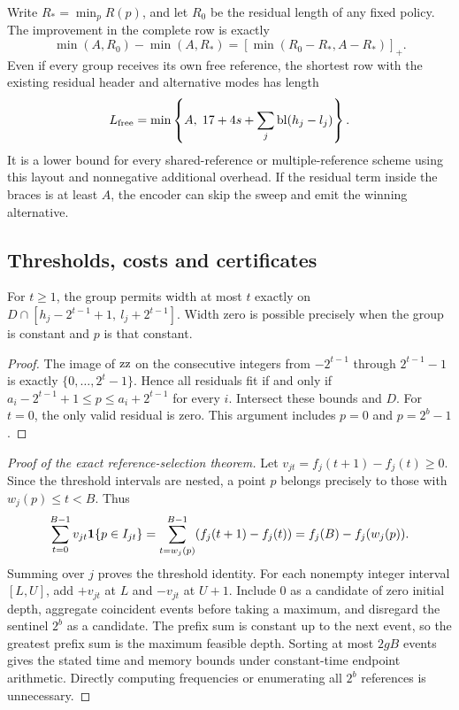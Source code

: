 \begin{proposition}\label{th:lower}
Write $R_*=\min_p R(p)$, and let $R_0$ be the residual length of any fixed policy. The improvement in the complete row is exactly
\[
 \min(A,R_0)-\min(A,R_*)=[\min(R_0-R_*,A-R_*)]_+ .
\]
Even if every group receives its own free reference, the shortest row with the existing residual header and alternative modes has length
\[
 L_{\rm free}=\min\left\{A,\;17+4s+\sum_j\operatorname{bl}(h_j-l_j)\right\}.
\]
It is a lower bound for every shared-reference or multiple-reference scheme using this layout and nonnegative additional overhead. If the residual term inside the braces is at least $A$, the encoder can skip the sweep and emit the winning alternative.
\end{proposition}


\subsection{Thresholds, costs and certificates}
\begin{lemma}\label{lem:threshold}
For $t\ge1$, the group permits width at most $t$ exactly on
$D\cap [h_j-2^{t-1}+1,\ l_j+2^{t-1}]$. Width zero is possible precisely when the group is constant and $p$ is that constant.
\end{lemma}
\begin{proof}
The image of $\operatorname{zz}$ on the consecutive integers from $-2^{t-1}$ through $2^{t-1}-1$ is exactly $\{0,\ldots,2^t-1\}$. Hence all residuals fit if and only if $a_i-2^{t-1}+1\le p\le a_i+2^{t-1}$ for every $i$. Intersect these bounds and $D$. For $t=0$, the only valid residual is zero. This argument includes $p=0$ and $p=2^b-1$.
\end{proof}
\begin{proof}[Proof of the exact reference-selection theorem]
Let $v_{jt}=f_j(t+1)-f_j(t)\ge0$. Since the threshold intervals are nested, a point $p$ belongs precisely to those with $w_j(p)\le t<B$. Thus
\[
 \sum_{t=0}^{B-1}v_{jt}\mathbf 1\{p\in I_{jt}\}
 =\sum_{t=w_j(p)}^{B-1}(f_j(t+1)-f_j(t))=f_j(B)-f_j(w_j(p)).
\]
Summing over $j$ proves the threshold identity. For each nonempty integer interval $[L,U]$, add $+v_{jt}$ at $L$ and $-v_{jt}$ at $U+1$. Include $0$ as a candidate of zero initial depth, aggregate coincident events before taking a maximum, and disregard the sentinel $2^b$ as a candidate. The prefix sum is constant up to the next event, so the greatest prefix sum is the maximum feasible depth. Sorting at most $2gB$ events gives the stated time and memory bounds under constant-time endpoint arithmetic. Directly computing frequencies or enumerating all $2^b$ references is unnecessary.
\end{proof}

